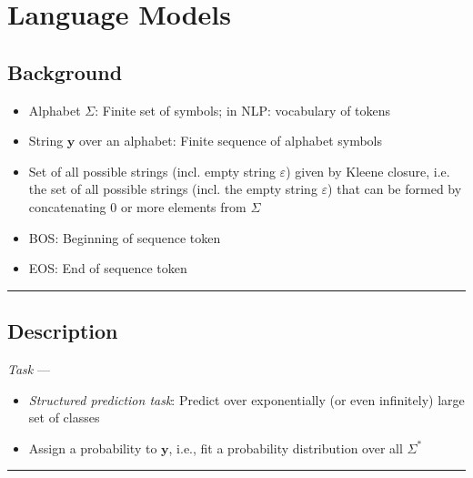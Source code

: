 \section{Language Models}
\subsection*{Background}
\begin{itemize}
    \item Alphabet $\Sigma$: Finite set of symbols; in NLP: vocabulary of tokens
    \item String $\boldsymbol{y}$ over an alphabet: Finite sequence of alphabet symbols
    \item Set of all possible strings (incl. empty string $\varepsilon$) given by Kleene closure, i.e. the set of all possible strings (incl. the empty string $\varepsilon$) that can be formed by concatenating 0 or more elements from $\Sigma$
    \item BOS: Beginning of sequence token
    \item EOS: End of sequence token
\end{itemize}

{\color{black}\hrule height 0.001mm}

\subsection*{Description}
\emph{Task} --- 
\begin{itemize}
    \item \emph{Structured prediction task}: Predict over exponentially (or even infinitely) large set of classes
    \item Assign a probability to $\boldsymbol{y}$, i.e., fit a probability distribution over all $\Sigma^*$
\end{itemize}

{\color{black}\hrule height 0.001mm}

